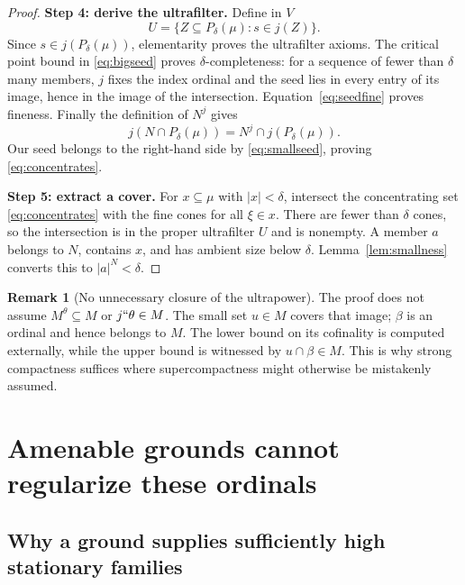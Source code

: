 \documentclass[11pt,letterpaper]{article}
\theoremstyle{definition}
\newtheorem{remark}[definition]{Remark}
\numberwithin{equation}{section}
\begin{document}
\begin{proof}
\textbf{Step 4: derive the ultrafilter.}
Define in $V$
\[
U=\{Z\subseteq P_\delta(\mu):s\in j(Z)\}.
\]
Since $s\in j(P_\delta(\mu))$, elementarity proves the ultrafilter
axioms. The critical point bound in \eqref{eq:bigseed} proves
$\delta$-completeness: for a sequence of fewer than $\delta$ many
members, $j$ fixes the index ordinal and the seed lies in every entry
of its image, hence in the image of the intersection.
Equation~\eqref{eq:seedfine} proves fineness. Finally the definition of
$N^j$ gives
\[
j(N\cap P_\delta(\mu))=N^j\cap j(P_\delta(\mu)).
\]
Our seed belongs to the right-hand side by \eqref{eq:smallseed}, proving
\eqref{eq:concentrates}.

\textbf{Step 5: extract a cover.}
For $x\subseteq\mu$ with $|x|<\delta$, intersect the concentrating
set \eqref{eq:concentrates} with the fine cones for all $\xi\in x$.
There are fewer than $\delta$ cones, so the intersection is in the
proper ultrafilter $U$ and is nonempty. A member $a$ belongs to $N$,
contains $x$, and has ambient size below $\delta$.
Lemma~\ref{lem:smallness} converts this to $|a|^N<\delta$.
\end{proof}

\begin{remark}[No unnecessary closure of the ultrapower]
The proof does not assume $M^\theta\subseteq M$ or
$j``\theta\in M$. The small set $u\in M$ covers that image;
$\beta$ is an ordinal and hence belongs to $M$.
The lower bound on its cofinality is computed externally, while the
upper bound is witnessed by $u\cap\beta\in M$. This is why strong
compactness suffices where supercompactness might otherwise be
mistakenly assumed.
\end{remark}

\section{Amenable grounds cannot regularize these ordinals}\label{sec:grounds}

\subsection{Why a ground supplies sufficiently high stationary families}
\end{document}
